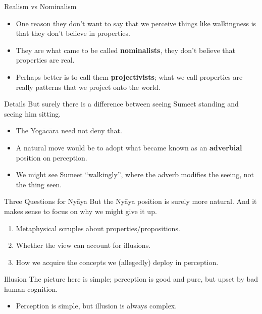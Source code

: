 \documentclass[
  17pt,
  letterpaper,
  ignorenonframetext,
  aspectratio=169,
]{beamer}
\providecommand{\tightlist}{%
  \setlength{\itemsep}{0pt}\setlength{\parskip}{0pt}}\usepackage{longtable,booktabs,array}
\begin{document}
\begin{frame}{Realism vs Nominalism}
\protect\hypertarget{realism-vs-nominalism}{}
\begin{itemize}[<+->]
\tightlist
\item
  One reason they don't want to say that we perceive things like
  walkingness is that they don't believe in properties.
\item
  They are what came to be called \textbf{nominalists}, they don't
  believe that properties are real.
\item
  Perhaps better is to call them \textbf{projectivists}; what we call
  properties are really patterns that we project onto the world.
\end{itemize}
\end{frame}

\begin{frame}{Details}
\protect\hypertarget{details}{}
But surely there is a difference between seeing Sumeet standing and
seeing him sitting.

\begin{itemize}[<+->]
\tightlist
\item
  The Yogācāra need not deny that.
\item
  A natural move would be to adopt what became known as an
  \textbf{adverbial} position on perception.
\item
  We might see Sumeet ``walkingly'', where the adverb modifies the
  seeing, not the thing seen.
\end{itemize}
\end{frame}

\begin{frame}{Three Questions for Nyāya}
\protect\hypertarget{three-questions-for-nyux101ya}{}
But the Nyāya position is surely more natural. And it makes sense to
focus on why we might give it up.

\begin{enumerate}[<+->]
\tightlist
\item
  Metaphysical scruples about properties/propositions.
\item
  Whether the view can account for illusions.
\item
  How we acquire the concepts we (allegedly) deploy in perception.
\end{enumerate}
\end{frame}

\begin{frame}{Illusion}
\protect\hypertarget{illusion}{}
The picture here is simple; perception is good and pure, but upset by
bad human cognition.

\begin{itemize}[<+->]
\tightlist
\item
  Perception is simple, but illusion is always complex.
\end{itemize}
\end{frame}
\end{document}
